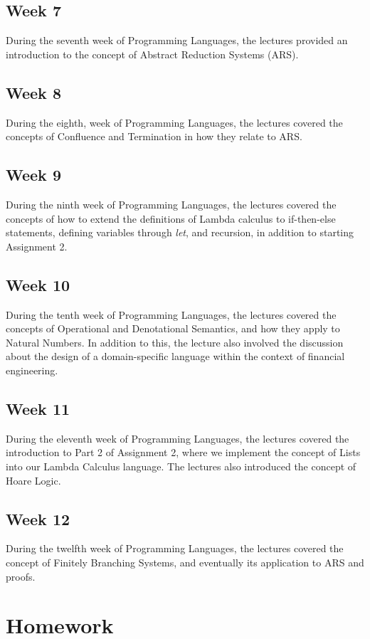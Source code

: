 \documentclass{article}
\theoremstyle{theorem}
\theoremstyle{definition}
\theoremstyle{remark}
\begin{document}
\subsection{Week 7} During the seventh week of Programming Languages, the lectures provided an introduction to the concept of Abstract Reduction Systems (ARS).
\subsection{Week 8} During the eighth, week of Programming Languages, the lectures covered the concepts of Confluence and Termination in how they relate to ARS.
\subsection{Week 9} During the ninth week of Programming Languages, the lectures covered the concepts of how to extend the definitions of Lambda calculus to if-then-else statements, defining variables through \textit{let}, and recursion, in addition to starting Assignment 2.
\subsection{Week 10} During the tenth week of Programming Languages, the lectures covered the concepts of Operational and Denotational Semantics, and how they apply to Natural Numbers. In addition to this, the lecture also involved the discussion about the design of a domain-specific language within the context of financial engineering.
\subsection{Week 11} During the eleventh week of Programming Languages, the lectures covered the introduction to Part 2 of Assignment 2, where we implement the concept of Lists into our Lambda Calculus language. The lectures also introduced the concept of Hoare Logic.
\subsection{Week 12} During the twelfth week of Programming Languages, the lectures covered the concept of Finitely Branching Systems, and eventually its application to ARS and proofs.
\section{Homework}\label{homework}
\end{document}
